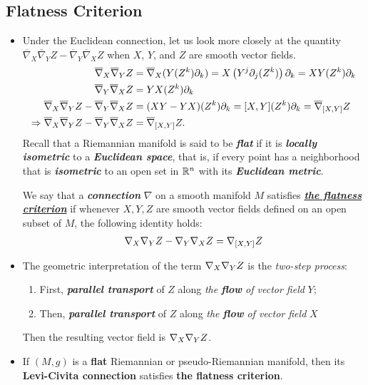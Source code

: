 \documentclass[11pt]{article}
\begin{document}
\subsection{Flatness Criterion}
\begin{itemize}
\item \begin{remark}
Under the Euclidean connection, let us look more closely at the quantity $\overline{\nabla}_{X}{\overline{\nabla}_{Y}}Z  - \overline{\nabla}_{Y}{\overline{\nabla}_{X}}Z$ when $X$, $Y$, and $Z$ are smooth vector fields.
\begin{align*}
\overline{\nabla}_{X}{\overline{\nabla}_{Y}}Z &= \overline{\nabla}_{X}{(Y(Z^k)\partial_k)} = X\left(Y^{j} \partial_j(Z^k)\right)\partial_k= XY(Z^k)\partial_k\\
\overline{\nabla}_{Y}{\overline{\nabla}_{X}}Z &= YX(Z^k)\partial_k\\
\overline{\nabla}_{X}{\overline{\nabla}_{Y}}Z  - \overline{\nabla}_{Y}{\overline{\nabla}_{X}}Z &= (XY - YX)(Z^k)\partial_k = [X, Y](Z^k)\partial_k = \overline{\nabla}_{[X, Y]}{Z}\\
\Rightarrow \overline{\nabla}_{X}{\overline{\nabla}_{Y}}Z  - \overline{\nabla}_{Y}{\overline{\nabla}_{X}}Z &=\overline{\nabla}_{[X, Y]}{Z}.
\end{align*} Recall that a Riemannian manifold is said to be \emph{\textbf{flat}} if it is \emph{\textbf{locally isometric}} to a \emph{\textbf{Euclidean space}}, that is, if every point has a neighborhood that is \emph{\textbf{isometric}} to an open set in ${\mathbb R}^n$ with its \emph{\textbf{Euclidean metric}}. 

We say that a \emph{\textbf{connection}} $\nabla$ on a smooth manifold $M$ satisfies \underline{\emph{\textbf{the flatness criterion}}} if whenever $X, Y, Z$ are smooth vector fields defined on an open subset of $M$, the following identity holds:
\begin{align}
\nabla_{X}{\nabla_{Y}{Z}} - \nabla_{Y}{\nabla_{X}{Z}}  = \nabla_{[X, Y]}{Z} \label{eqn: flatness_criterion}
\end{align}
\end{remark}

\item \begin{remark}
The geometric interpretation of the term $\nabla_{X}{\nabla_{Y}{Z}}$ is the \emph{two-step process}:
\begin{enumerate}
\item First, \emph{\textbf{parallel transport}} of $Z$ along \emph{the \textbf{flow} of vector field} $Y$;
\item Then, \emph{\textbf{parallel transport}} of $Z$ along \emph{the \textbf{flow} of vector field} $X$
\end{enumerate} Then the resulting vector field is $\nabla_{X}{\nabla_{Y}{Z}}$.
\end{remark}

\item \begin{proposition}
If $(M,g)$ is a \textbf{flat} Riemannian or pseudo-Riemannian manifold, then its \textbf{Levi-Civita connection} satisfies \textbf{the flatness criterion}.
\end{proposition}
\end{itemize}
\end{document}
